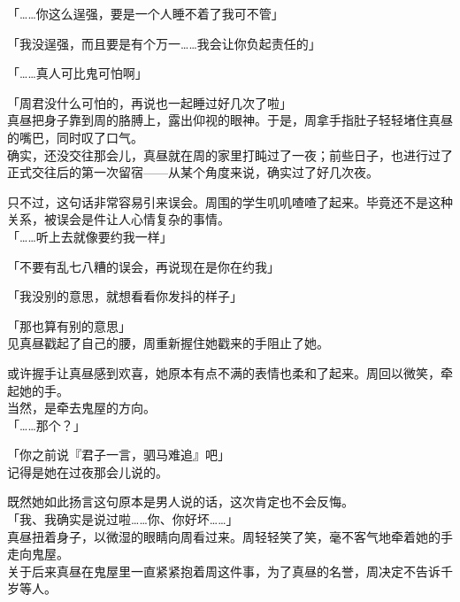 「……你这么逞强，要是一个人睡不着了我可不管」

「我没逞强，而且要是有个万一……我会让你负起责任的」

「……真人可比鬼可怕啊」

「周君没什么可怕的，再说也一起睡过好几次了啦」\\

真昼把身子靠到周的胳膊上，露出仰视的眼神。于是，周拿手指肚子轻轻堵住真昼的嘴巴，同时叹了口气。\\

确实，还没交往那会儿，真昼就在周的家里打盹过了一夜；前些日子，也进行过了正式交往后的第一次留宿——从某个角度来说，确实过了好几次夜。

只不过，这句话非常容易引来误会。周围的学生叽叽喳喳了起来。毕竟还不是这种关系，被误会是件让人心情复杂的事情。\\

「……听上去就像要约我一样」

「不要有乱七八糟的误会，再说现在是你在约我」

「我没别的意思，就想看看你发抖的样子」

「那也算有别的意思」\\

见真昼戳起了自己的腰，周重新握住她戳来的手阻止了她。

或许握手让真昼感到欢喜，她原本有点不满的表情也柔和了起来。周回以微笑，牵起她的手。\\

当然，是牵去鬼屋的方向。\\

「……那个？」

「你之前说『君子一言，驷马难追』吧」\\

记得是她在过夜那会儿说的。

既然她如此扬言这句原本是男人说的话，这次肯定也不会反悔。\\

「我、我确实是说过啦……你、你好坏……」\\

真昼扭着身子，以微湿的眼睛向周看过来。周轻轻笑了笑，毫不客气地牵着她的手走向鬼屋。\\

关于后来真昼在鬼屋里一直紧紧抱着周这件事，为了真昼的名誉，周决定不告诉千岁等人。

